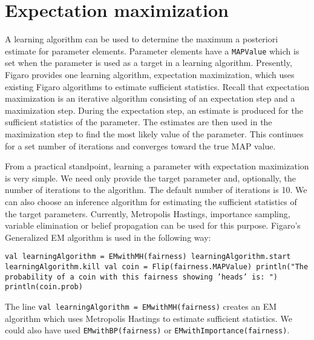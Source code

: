 \section{Expectation maximization}

A learning algorithm can be used to determine the maximum a posteriori estimate for parameter elements. Parameter elements have a \texttt{MAPValue} which is set when the parameter is used as a target in a learning algorithm. Presently, Figaro provides one learning algorithm, expectation maximization, which uses existing Figaro algorithms to estimate sufficient statistics. Recall that expectation maximization is an iterative algorithm consisting of an expectation step and a maximization step. During the expectation step, an estimate is produced for the sufficient statistics of the parameter. The estimates are then used in the maximization step to find the most likely value of the parameter. This continues for a set number of iterations and converges toward the true MAP value.

From a practical standpoint, learning a parameter with expectation maximization is very simple. We need only provide the target parameter and, optionally, the number of iterations to the algorithm. The default number of iterations is 10. We can also choose an inference algorithm for estimating the sufficient statistics of the target parameters. Currently, Metropolis Hastings, importance sampling, variable elimination or belief propagation can be used for this purpose. Figaro's Generalized EM algorithm is used in the following way:

\begin{flushleft}
\texttt{val learningAlgorithm = EMwithMH(fairness)
\newline learningAlgorithm.start
\newline learningAlgorithm.kill
\newline 
\newline val coin = Flip(fairness.MAPValue)
\newline println("The probability of a coin with this fairness showing
'heads' is: ")
\newline println(coin.prob)
}
\end{flushleft}

The line \texttt{val learningAlgorithm = EMwithMH(fairness)} creates an EM algorithm which uses Metropolis Hastings to estimate sufficient statistics. We could also have used \texttt{EMwithBP(fairness)} or 
\texttt{EMwithImp\-ortance(fairness)}. 

